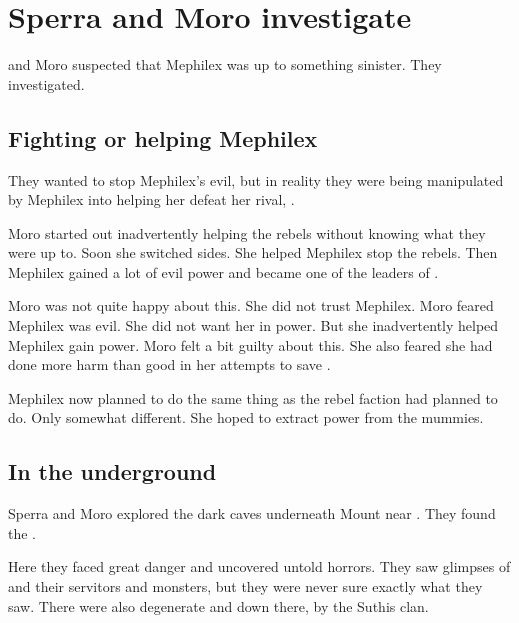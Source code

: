 \section{Sperra and Moro investigate}
\Sperra and Moro suspected that Mephilex was up to something sinister.
They investigated. 










\subsection{Fighting or helping Mephilex}
They wanted to stop Mephilex's evil, but in reality they were being manipulated by Mephilex into helping her defeat her rival, \UldraanKerross. 

Moro started out inadvertently helping the rebels without knowing what they were up to.
Soon she switched sides. 
She helped Mephilex stop the rebels. 
Then Mephilex gained a lot of evil power and became one of the leaders of \Yormis. 

Moro was not quite happy about this. 
She did not trust Mephilex.
Moro feared Mephilex was evil.
She did not want her in power.
But she inadvertently helped Mephilex gain power.
Moro felt a bit guilty about this. 
She also feared she had done more harm than good in her attempts to save \Yormis.

Mephilex now planned to do the same thing as the rebel faction had planned to do.
Only somewhat different. 
She hoped to extract power from the mummies. 









\subsection{In the underground}
Sperra and Moro explored the dark caves underneath Mount  near \Yormis.
They found the . 

Here they faced great danger and uncovered untold horrors. 
They saw glimpses of  and their servitors and monsters, but they were never sure exactly what they saw. 
There were also degenerate \scathae and \humans down there,  by the Suthis clan.  

